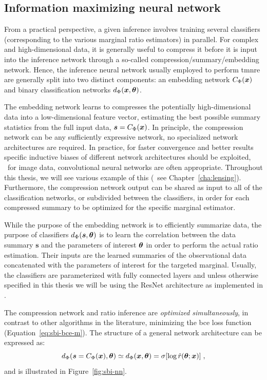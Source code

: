\subsection{Information maximizing neural network} \label{subsec:tmnre-nn}

From a practical perspective, a given inference involves training several classifiers (corresponding to the various marginal ratio estimators) in parallel. For complex and high-dimensional data, it is generally useful to compress it before it is input into the inference network through a so-called compression/summary/embedding network. Hence, the inference neural network usually employed to perform \gls*{tmnre} are generally split into two distinct components: an embedding network $C_\Phi(\bm{x})$ and binary classification networks $d_\Phi(\bm{x}, \bm{\theta})$. 

The embedding network learns to compresses the potentially high-dimensional data into a low-dimensional feature vector, estimating the best possible summary statistics from the full input data, $\boldsymbol{s}= C_\Phi(\bm{x})$. In principle, the compression network can be any sufficiently expressive network, no specialized network architectures are required. In practice, for faster convergence and better results specific inductive biases of different network architectures should be exploited, \eg~for image data, convolutional neural networks are often appropriate. Throughout this thesis, we will see various example of this (\eg~see Chapter~\ref{cha:lensing}). Furthermore, the compression network output can be shared as input to all of the classification networks, or subdivided between the classifiers, in order for each compressed summary to be optimized for the specific marginal estimator. 

While the purpose of the embedding network is to efficiently summarize data, the purpose of classifiers $d_\Phi(\boldsymbol{s}, \bm{\theta})$ is to learn the correlation between the data summary $\boldsymbol{s}$ and the parameters of interest $\bm{\theta}$ in order to perform the actual ratio estimation. Their inputs are the learned summaries of the observational data concatenated with the parameters of interest for the targeted marginal. Usually, the classifiers are parameterized with fully connected layers and unless otherwise specified in this thesis we will be using the ResNet \cite{he2016deep} architecture as implemented in \swyft \cite{Miller2022}.

The compression network and ratio inference are \emph{optimized simultaneously}, in contrast to other algorithms in the literature, minimizing the \gls*{bce} loss function (Equation~\eqref{eq:sbi-bce-m}). The structure of a general network architecture can be expressed as:
\begin{equation}\label{eq:nn-c}
    d_\Phi(\boldsymbol{s}= C_\Phi(\bm{x}), \bm{\theta}) \simeq  d_\Phi(\bm{x}, \bm{\theta})  = \sigma[ \log \hat{r}(\bm{\theta}; \bm{x})] \;,
\end{equation}
and is illustrated in Figure~\ref{fig:sbi-nn}.

